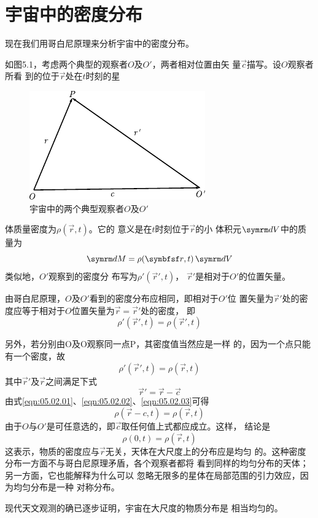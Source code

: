 \section{宇宙中的密度分布}\label{sec:05.02}

现在我们用哥白尼原理来分析宇宙中的密度分布。

如图5.1，考虑两个典型的观察者$ O $及$  O'   $，两者相对位置由矢
量$ \vec{c} $描写。设$ O $观察者所看
到的位于$ \vec{r} $处在$ t $时刻的星
\begin{figure}
    \centering
    \includegraphics{figure/fig05.01}
    \caption{宇宙中的两个典型观察者$ O $及$ O' $}
    \label{fig:05.01}
\end{figure}
体质量密度为$  \rho ( \vec{r} , t )   $。它的
意义是在$ t $时刻位于$ \vec{r} $的小
体积元$ \dif V $中的质量为
{\setlength\mathindent{3em}
\begin{equation*}
    \dif M = \rho ( \vec{r} , t ) \dif V
\end{equation*}}
类似地，$ O' $观察到的密度分
布写为$  \rho ' ( \vec{r} ' , t )   $， $ \vec{r} ' $是相对于$ O' $的位置矢量。

由哥白尼原理，$ O $及$ O' $看到的密度分布应相同，即相对于$ O' $位
置矢量为$ \vec{r} ' $处的密度应等于相对于$ O $位置矢量为$ \vec{r} = \vec{r} ' $处的密度，
即
\begin{equation}\label{eqn:05.02.01}
    \rho ' ( \vec{r} ' , t ) = \rho ( \vec{r} ' , t )
\end{equation}

另外，若分别由O及O观察同一点P，其密度值当然应是一样
的，因为一个点只能有一个密度，故
\begin{equation}\label{eqn:05.02.02}
    \rho ' ( \vec{r} ' , t ) = \rho ( \vec{r} , t )
\end{equation}
其中$ \vec{r} ' $及$ \vec{r} $之间满足下式
\begin{equation}\label{eqn:05.02.03}
    \vec{r} ' = \vec{r} - \vec{c}
\end{equation}
由式\eqref{eqn:05.02.01}、\eqref{eqn:05.02.02}、\eqref{eqn:05.02.03}可得
\begin{equation}\label{eqn:05.02.04}
    \rho ( \vec{r} - c , t ) = \rho ( \vec{r} , t )
\end{equation}
由于$ O $与$ O' $是可任意选的，即$ \vec{c} $取任何值上式都应成立。这样，
结论是\vspace{-1.2em}
\begin{equation}\label{eqn:05.02.05}
    \rho ( 0 , t ) = \rho ( \vec{r} , t )
\end{equation}
这表示，物质的密度应与$ \vec{r} $无关，天体在大尺度上的分布应是均匀
的。这种密度分布一方面不与哥白尼原理矛盾，各个观察者都将
看到同样的均匀分布的天体；另一方面，它也能解释为什么可以
忽略无限多的星体在局部范围的引力效应，因为均匀分布是一种
对称分布。

现代天文观测的确已逐步证明，宇宙在大尺度的物质分布是
相当均匀的。